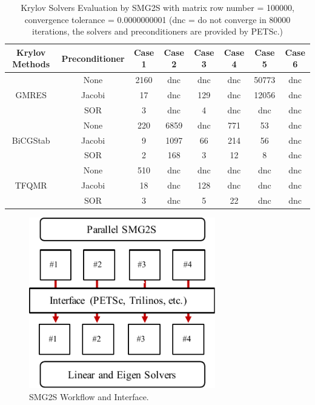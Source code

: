 \begin{table}[h]
	\caption{Krylov Solvers Evaluation by SMG2S with matrix row number = \num[round-precision=2,round-mode=figures]{100000}, convergence tolerance = \num[round-precision=2,round-mode=figures]{0.0000000001} (dnc = do not converge in  \num[round-precision=2,round-mode=figures]{80000} iterations, the solvers and preconditioners are provided by PETSc.)}
	\label{krylov}
	\centering
	\footnotesize
	\renewcommand{\arraystretch}{1.5}
	\begin{tabular}{cccccccc}
		\hline
		\textbf{Krylov Methods} & \textbf{Preconditioner} & \textbf{Case 1} & \textbf{Case 2} 
		& \textbf{Case 3} & \textbf{Case 4} & \textbf{Case 5} & \textbf{Case 6} \\ 
		\hline
		\multirow{3}{*}{GMRES} & None & 2160 & dnc
		& dnc & dnc &50773 & dnc\\ 
		\cline{2-8}
		& Jacobi& 17 & dnc & 129 & dnc &12056 & dnc\\
		\cline{2-8}
		& SOR& 3 &dnc & 4 &dnc & dnc & dnc\\
		\hline
		\multirow{3}{*}{BiCGStab} & None & 220 & 6859
		& dnc&771 &53 &dnc\\ 
		\cline{2-8}
		& Jacobi& 9& 1097 & 66 &214 & 56 &dnc\\
		\cline{2-8}
		& SOR&2 &168 & 3 & 12 & 8& dnc\\
		\hline
		\multirow{3}{*}{TFQMR} & None & 510 & dnc
		& dnc &dnc &dnc& dnc\\ 
		\cline{2-8}
		& Jacobi& 18 & dnc & 128 & dnc & dnc& dnc\\
		\cline{2-8}
		& SOR& 3&dnc &  5&22 &dnc& dnc\\
		\hline
		
	\end{tabular}
\end{table}

\begin{figure}[htbp]
	\centering
	\includegraphics[width=3.2in]{fig/interface.pdf}
	\caption{SMG2S Workflow and Interface.}
	\label{fig:interface}
\end{figure}


